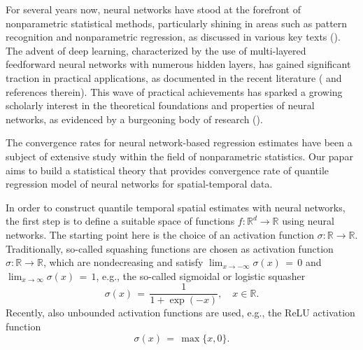 \documentclass[twoside,11pt]{article}
\begin{document}
For several years now, neural networks have stood at the forefront of nonparametric statistical methods, particularly shining in areas such as pattern recognition and nonparametric regression, as discussed in various key texts (\cite{anthony1999neural, devroye2013probabilistic, gyorfi2002distribution, haykin1998neural,hertz2018introduction}). The advent of deep learning, characterized by the use of multi-layered feedforward neural networks with numerous hidden layers, has gained significant traction in practical applications, as documented in the recent literature (\citep{schmidhuber2015deep} and references therein). This wave of practical achievements has sparked a growing scholarly interest in the theoretical foundations and properties of neural networks, as evidenced by a burgeoning body of research (\cite{schmidhuber2015deep, eldan2016power, elbrachter2021deep, yarotsky2018optimal, yarotsky2020phase, lu2021deep}). 

The convergence rates for neural network-based regression estimates have been a subject of extensive study within the field of nonparametric statistics. Our papar aims to build a statistical theory that provides convergence rate of quantile
regression model of neural networks for spatial-temporal data. 

In order to construct quantile temporal spatial estimates with neural networks, the first step is to define a suitable space of functions \( f : \mathbb{R}^d \to \mathbb{R} \) using neural networks. The starting point here is the choice of an activation function \( \sigma : \mathbb{R} \to \mathbb{R} \). Traditionally, so-called squashing functions are chosen as activation function \( \sigma : \mathbb{R} \to \mathbb{R} \), which are nondecreasing and satisfy \( \lim_{x \to -\infty} \sigma(x) \,=\, 0 \) and \( \lim_{x \to \infty} \sigma(x) \,=\, 1 \), e.g., the so-called sigmoidal or logistic squasher
\begin{equation} \label{eq:sigmoid}
\sigma(x) \,=\, \frac{1}{1 + \exp(-x)}, \quad x \in \mathbb{R}.
\end{equation}
Recently, also unbounded activation functions are used, e.g., the ReLU activation function
\begin{equation} \label{eq:relu}
\sigma(x) \,=\, \max\{x, 0\}.
\end{equation}
\end{document}
